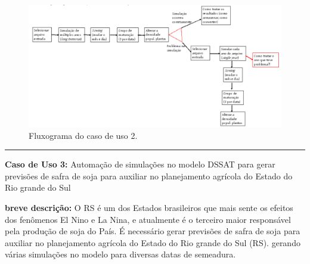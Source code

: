 \documentclass[tg]{mdtufsm}
\begin{document}

                \bigskip
            	\begin{figure}[!htb]
            		{\centering
            		\includegraphics[width=1.0\textwidth]{imagens/SoysimFlux}
            		\caption{Fluxograma do caso de uso 2.}
            		\label{fig:SoysimFlux}}
            	\end{figure}
                \bigskip


                \hrule \bigskip
            	{\bf Caso de Uso 3:}
                    Automação de simulações no modelo DSSAT para gerar previsões de safra de soja para auxiliar no planejamento agrícola do Estado do Rio grande do Sul
            	    \bigskip

                {\bf breve descrição:}
                    O RS é um dos Estados brasileiros que mais sente os efeitos dos fenômenos El Nino e La Nina, e atualmente é o terceiro maior responsável pela produção de soja do País. É necessário gerar previsões de safra de soja para auxiliar no planejamento agrícola do Estado do Rio grande do Sul (RS). gerando várias simulações no modelo para diversas datas de semeadura.
                    \bigskip
\end{document}
